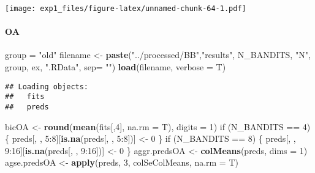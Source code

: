 \documentclass[11pt,,]{article}
\newenvironment{Shaded}{\begin{snugshade}}{\end{snugshade}}
\newcommand{\KeywordTok}[1]{\textcolor[rgb]{0.13,0.29,0.53}{\textbf{{#1}}}}
\newcommand{\DataTypeTok}[1]{\textcolor[rgb]{0.13,0.29,0.53}{{#1}}}
\newcommand{\DecValTok}[1]{\textcolor[rgb]{0.00,0.00,0.81}{{#1}}}
\newcommand{\StringTok}[1]{\textcolor[rgb]{0.31,0.60,0.02}{{#1}}}
\newcommand{\NormalTok}[1]{{#1}}
\let\oldparagraph\paragraph
\renewcommand{\paragraph}[1]{\oldparagraph{#1}\mbox{}}
\begin{document}
\texttt{[image: exp1\_files/figure-latex/unnamed-chunk-64-1.pdf]}

\newpage

\paragraph{OA}\label{oa}

\begin{Shaded}
\begin{Highlighting}[]
\NormalTok{group =}\StringTok{ "old"}
\NormalTok{filename  <-}\StringTok{ }\KeywordTok{paste}\NormalTok{(}\StringTok{"../processed/BB"}\NormalTok{,}\StringTok{"results"}\NormalTok{, N_BANDITS, }\StringTok{"N"}\NormalTok{, }
                   \NormalTok{group, ex, }\StringTok{".RData"}\NormalTok{, }\DataTypeTok{sep=} \StringTok{""}\NormalTok{)}
\KeywordTok{load}\NormalTok{(filename, }\DataTypeTok{verbose =} \NormalTok{T)}
\end{Highlighting}
\end{Shaded}

\begin{verbatim}
## Loading objects:
##   fits
##   preds
\end{verbatim}

\begin{Shaded}
\begin{Highlighting}[]
\NormalTok{bicOA <-}\StringTok{ }\KeywordTok{round}\NormalTok{(}\KeywordTok{mean}\NormalTok{(fits[,}\DecValTok{4}\NormalTok{], }\DataTypeTok{na.rm =} \NormalTok{T), }\DataTypeTok{digits =} \DecValTok{1}\NormalTok{)}
\NormalTok{if (N_BANDITS ==}\StringTok{ }\DecValTok{4}\NormalTok{) \{}
    \NormalTok{preds[, , }\DecValTok{5}\NormalTok{:}\DecValTok{8}\NormalTok{][}\KeywordTok{is.na}\NormalTok{(preds[, , }\DecValTok{5}\NormalTok{:}\DecValTok{8}\NormalTok{])] <-}\StringTok{ }\DecValTok{0}
\NormalTok{\}}
\NormalTok{if (N_BANDITS ==}\StringTok{ }\DecValTok{8}\NormalTok{) \{}
    \NormalTok{preds[, , }\DecValTok{9}\NormalTok{:}\DecValTok{16}\NormalTok{][}\KeywordTok{is.na}\NormalTok{(preds[, , }\DecValTok{9}\NormalTok{:}\DecValTok{16}\NormalTok{])] <-}\StringTok{ }\DecValTok{0}
\NormalTok{\}}
\NormalTok{aggr.predsOA <-}\StringTok{ }\KeywordTok{colMeans}\NormalTok{(preds, }\DataTypeTok{dims =} \DecValTok{1}\NormalTok{) }
\NormalTok{agse.predsOA <-}\StringTok{ }\KeywordTok{apply}\NormalTok{(preds, }\DecValTok{3}\NormalTok{, colSeColMeans, }\DataTypeTok{na.rm =} \NormalTok{T) }
\end{Highlighting}
\end{Shaded}
\end{document}
